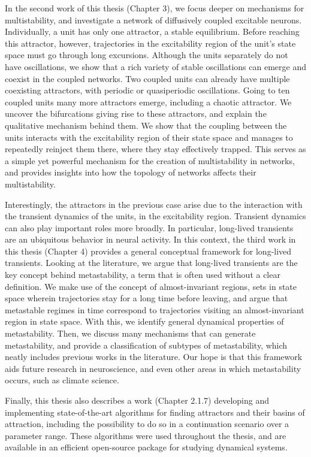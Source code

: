 In the second work of this thesis (Chapter 3), we focus deeper on mechanisms for multistability, and investigate a network of diffusively coupled excitable neurons. Individually, a unit has only one attractor, a stable equilibrium. Before reaching this attractor, however, trajectories in the excitability region of the unit's state space must go through long excursions. Although the units separately do not have oscillations, we show that a rich variety of stable oscillations can emerge and coexist in the coupled networks. Two coupled units can already have multiple coexisting attractors, with periodic or quasiperiodic oscillations. Going to ten coupled units many more attractors emerge, including a chaotic attractor. We uncover the bifurcations giving rise to these attractors, and explain the qualitative mechanism behind them. We show that the coupling between the units interacts with the excitability region of their state space and manages to repeatedly reinject them there, where they stay effectively trapped. This serves as a simple yet powerful mechanism for the creation of multistability in networks, and provides insights into how the topology of networks affects their multistability. 

Interestingly, the attractors in the previous case arise due to the interaction with the transient dynamics of the units, in the excitability region. Transient dynamics can also play important roles more broadly. In particular, long-lived transients are an ubiquitous behavior in neural activity. In this context, the third work in this thesis (Chapter 4) provides a general conceptual framework for long-lived transients. Looking at the literature, we argue that long-lived transients are the key concept behind metastability, a term that is often used without a clear definition. We make use of the concept of almost-invariant regions, sets in state space wherein trajectories stay for a long time before leaving, and argue that metastable regimes in time correspond to trajectories visiting an almost-invariant region in state space. With this, we identify general dynamical properties of metastability. Then, we discuss many mechanisms that can generate metastability, and provide a classification of subtypes of metastability, which neatly includes previous works in the literature. Our hope is that this framework aids future research in neuroscience, and even other areas in which metastability occurs, such as climate science.

Finally, this thesis also describes a work (Chapter 2.1.7) developing and implementing state-of-the-art algorithms for finding attractors and their basins of attraction, including the possibility to do so in a continuation scenario over a parameter range. These algorithms were used throughout the thesis, and are available in an efficient open-source package for studying dynamical systems. 






